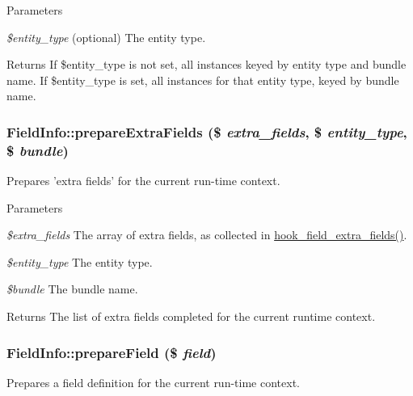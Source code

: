 \begin{DoxyParams}{Parameters}
\item[{\em \$entity\_\-type}](optional) The entity type.\end{DoxyParams}
\begin{DoxyReturn}{Returns}
If \$entity\_\-type is not set, all instances keyed by entity type and bundle name. If \$entity\_\-type is set, all instances for that entity type, keyed by bundle name. 
\end{DoxyReturn}
\hypertarget{classFieldInfo_af1a6d10db6c9fc2d4942108edfd9c31f}{
\subsubsection[{prepareExtraFields}]{\setlength{\rightskip}{0pt plus 5cm}FieldInfo::prepareExtraFields (\$ {\em extra\_\-fields}, \/  \$ {\em entity\_\-type}, \/  \$ {\em bundle})}}
\label{classFieldInfo_af1a6d10db6c9fc2d4942108edfd9c31f}
Prepares 'extra fields' for the current run-\/time context.


\begin{DoxyParams}{Parameters}
\item[{\em \$extra\_\-fields}]The array of extra fields, as collected in \hyperlink{group__hooks_ga7100332aa5b4d5f6ba72534599d133e5}{hook\_\-field\_\-extra\_\-fields()}. \item[{\em \$entity\_\-type}]The entity type. \item[{\em \$bundle}]The bundle name.\end{DoxyParams}
\begin{DoxyReturn}{Returns}
The list of extra fields completed for the current runtime context. 
\end{DoxyReturn}
\hypertarget{classFieldInfo_a5fd135e121bf0e42cbb6a44e7a46a656}{
\subsubsection[{prepareField}]{\setlength{\rightskip}{0pt plus 5cm}FieldInfo::prepareField (\$ {\em field})}}
\label{classFieldInfo_a5fd135e121bf0e42cbb6a44e7a46a656}
Prepares a field definition for the current run-\/time context.


